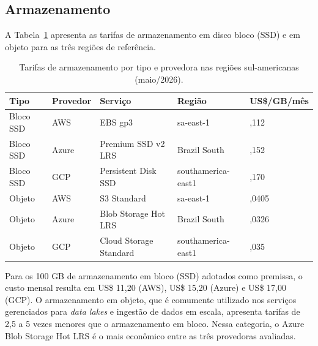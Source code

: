 \subsection{Armazenamento}

A Tabela~\ref{tab:custo_storage} apresenta as tarifas de armazenamento em disco bloco
(SSD) e em objeto para as três regiões de referência.

\begin{table}[H]
    \centering
    \small
    \setlength{\extrarowheight}{3pt}
    \renewcommand{\arraystretch}{1.3}
    \begin{tabular}{
        >{\raggedright\arraybackslash}p{2.6cm}
        >{\centering\arraybackslash}p{1.8cm}
        >{\raggedright\arraybackslash}p{3.8cm}
        >{\raggedright\arraybackslash}p{3.4cm}
        >{\centering\arraybackslash}p{1.8cm}
    }
        \toprule
        \textbf{Tipo} & \textbf{Provedor} & \textbf{Serviço} &
        \textbf{Região} & \textbf{US\$/GB/mês} \\
        \midrule
        \rowcolor[gray]{0.96}
        Bloco SSD & AWS   & EBS gp3                   & sa-east-1            & 0,112  \\
        Bloco SSD & Azure & Premium SSD v2 LRS         & Brazil South         & 0,152  \\
        \rowcolor[gray]{0.96}
        Bloco SSD & GCP   & Persistent Disk SSD        & southamerica-east1   & 0,170  \\
        \midrule
        Objeto    & AWS   & S3 Standard                & sa-east-1            & 0,0405 \\
        \rowcolor[gray]{0.96}
        Objeto    & Azure & Blob Storage Hot LRS        & Brazil South         & 0,0326 \\
        Objeto    & GCP   & Cloud Storage Standard      & southamerica-east1   & 0,035  \\
        \bottomrule
    \end{tabular}
    \caption{Tarifas de armazenamento por tipo e provedora nas regiões sul-americanas
    (maio/2026).}
    \label{tab:custo_storage}
\end{table}

Para os 100 GB de armazenamento em bloco (SSD) adotados como premissa, o custo
mensal resulta em US\$ 11,20 (AWS), US\$ 15,20 (Azure) e US\$ 17,00 (GCP).
O armazenamento em objeto, que é comumente utilizado nos serviços gerenciados para
\textit{data lakes} e ingestão de dados em escala, apresenta tarifas de 2,5
a 5 vezes menores que o armazenamento em bloco. Nessa categoria, o Azure Blob
Storage Hot LRS é o mais econômico entre as três provedoras avaliadas.

